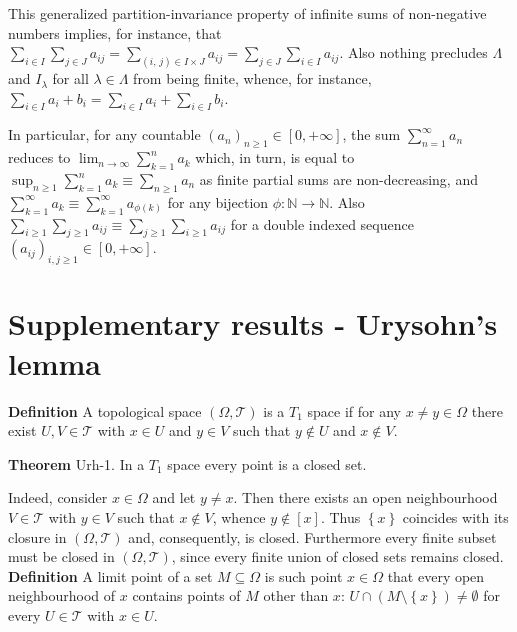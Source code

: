 \documentclass[a4paper]{article}
\newcommand{\obj}[1]{\left\{ #1 \right \}}
\newcommand{\clo}[1]{\left [ #1 \right ]}
\newcommand{\brac}[1]{\left ( #1 \right )}
\newcommand{\Zinf}{\clo{ 0, +\infty }}
\newcommand{\Tcal}{\mathcal{T}}
\begin{document}
This generalized partition-invariance property of infinite sums of non-negative numbers implies, for instance, that $\sum_{i\in I} \sum_{j\in J} a_{ij} = \sum_{\brac{i,\,j}\in I\times J} a_{ij} = \sum_{j\in J} \sum_{i\in I} a_{ij}$. Also nothing precludes $\Lambda$ and $I_\lambda$ for all $\lambda\in \Lambda$ from being finite, whence, for instance, $\sum_{i\in I} a_i+b_i = \sum_{i\in I} a_i+\sum_{i\in I} b_i$.

In particular, for any countable $\brac{a_n}_{n\geq 1}\in \Zinf$, the sum $\sum_{n=1}^\infty a_n$ reduces to $\lim_{n \to \infty} \sum_{k=1}^n a_k$ which, in turn, is equal to $\sup_{n\geq 1} \sum_{k=1}^n a_k \equiv \sum_{n\geq 1} a_n$ as finite partial sums are non-decreasing, and $\sum_{k = 1}^\infty a_k \equiv \sum_{k = 1}^\infty a_{\phi(k)}$ for any bijection $\phi:\mathbb{N}\to \mathbb{N}$. Also $\sum_{i\geq 1}\sum_{j\geq 1} a_{ij} \equiv \sum_{j\geq 1}\sum_{i\geq 1} a_{ij}$ for a double indexed sequence $\brac{a_{ij}}_{i,j\geq 1}\in \Zinf$.


\section{Supplementary results - Urysohn's lemma} %
\label{sec:urysohn_s_lemma}

\noindent \textbf{Definition}
A topological space $\brac{\Omega, \Tcal}$ is a $T_1$ space if for any $x\neq y\in \Omega$ there exist $U,V\in \Tcal$ with $x\in U$ and $y\in V$ such that $y\notin U$ and $x\notin V$.

\label{thm:t1_closed_atom}\noindent \textbf{Theorem} Urh-1.
In a $T_1$ space every point is a closed set.

Indeed, consider $x\in\Omega$ and let $y\neq x$. Then there exists an open neighbourhood $V\in \Tcal$ with $y\in V$ such that $x\notin V$, whence $y\notin\clo{x}$. Thus $\obj{x}$ coincides with its closure in $\brac{\Omega, \Tcal}$ and, consequently, is closed. Furthermore every finite subset must be closed in $\brac{\Omega,\Tcal}$, since every finite union of closed sets remains closed.\\

\noindent \textbf{Definition}
A limit point of a set $M\subseteq \Omega$ is such point $x\in \Omega$ that every open neighbourhood of $x$ contains points of $M$ other than $x$: $U\cap \brac{M\setminus \obj{x}}\neq \emptyset$ for every $U\in \Tcal$ with $x\in U$.
\end{document}
